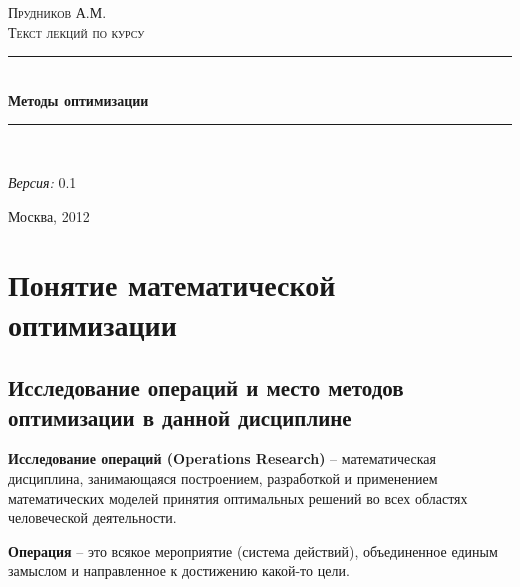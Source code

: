 \documentclass[a4paper,12pt]{report}
\newcommand{\docTitle}{Методы оптимизации}
\newcommand{\docVersion}{0.1}
\newcommand{\HRule}{\rule{\linewidth}{0.5mm}} %
\begin{document}
\begin{titlepage}

\begin{center}

\textsc{\LARGE Прудников А.М.}\\[7.0cm]

\textsc{\Large Текст лекций по курсу}\\[0.5cm]

\HRule \\[0.4cm]
{ \huge \bfseries \docTitle}\\[0.4cm]

\HRule \\[1.5cm]

\begin{minipage}{0.8\textwidth}
\begin{flushright} \large
\emph{Версия:} \docVersion
\end{flushright}
\end{minipage}

\vfill

{\large Москва, 2012}

\end{center}

\end{titlepage}

\setcounter{page}{2}

\pagestyle{plain}

\clearpage

\tableofcontents

\clearpage

\chapter{Понятие математической оптимизации}

\section{Исследование операций и место методов оптимизации в данной дисциплине}

\textbf{Исследование операций (Operations Research)} – математическая дисциплина, занимающаяся построением, разработкой и применением математических моделей принятия оптимальных решений во всех областях человеческой деятельности.

\textbf{Операция} – это всякое мероприятие (система действий), объединенное единым замыслом и направленное к достижению какой-то цели.
\end{document}
